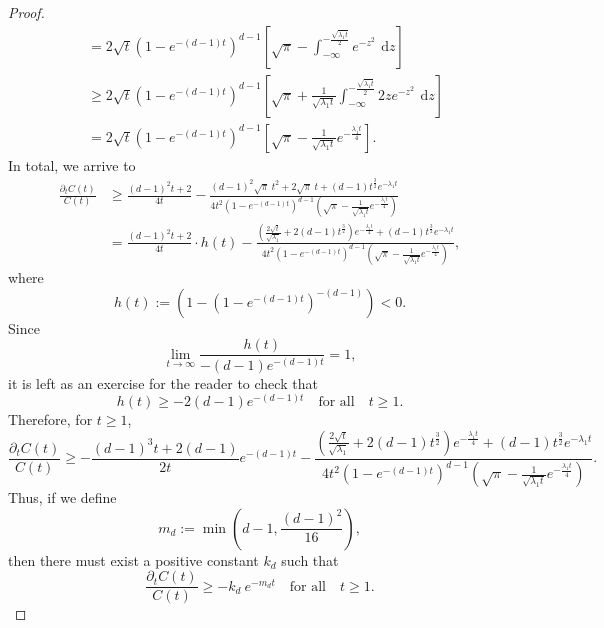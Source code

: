 \documentclass[10pt,a4paper]{amsart}
\def\d{\,\mathrm{d}}
\begin{document}
\begin{proof}
\[\begin{aligned}
		&= 2\sqrt{t} \left(1- e^{-(d-1)t}\right)^{d-1}\left[\sqrt{\pi} - \int_{-\infty}^{-\frac{\sqrt{\lambda_1 t}}{2}}  e^{-z^2}\ \d z \right]\\[10pt]
		&\geq 2\sqrt{t} \left(1- e^{-(d-1)t}\right)^{d-1}\left[\sqrt{\pi} +\frac{1}{\sqrt{\lambda_1 t}} \int_{-\infty}^{-\frac{\sqrt{\lambda_1 t}}{2}} 2z e^{-z^2}\ \d z \right]\\[10pt]
		&= 2\sqrt{t} \left(1- e^{-(d-1)t}\right)^{d-1}\left[\sqrt{\pi} - \frac{1}{\sqrt{\lambda_1 t}}e^{-{\frac{\lambda_1 t}{4}}} \right].
	\end{aligned}
	\]
	In total, we arrive to
	\[
	\begin{aligned}
		\frac{\partial_t C(t)}{C(t)}&\geq \frac{(d-1)^2t+2}{4t} - \frac{(d-1)^2\sqrt{\pi}\ t^2  +2\sqrt{\pi}\ t  + (d-1)t^\frac{3}{2}e^{-\lambda_1 t}}{4t^2\left(1-e^{-(d-1)t}\right)^{d-1} \left(\sqrt{\pi} - \frac{1}{\sqrt{\lambda_1 t}}e^{-\frac{\lambda_1 t}{4}}\right)}\\[10pt]
		&=\frac{(d-1)^2t+2}{4t}\cdot h(t) - \frac{\left(\frac{2\sqrt{t}}{\sqrt{\lambda_1}}+2(d-1)t^{\frac{3}{2}}\right)e^{-\frac{\lambda_1 t}{4}} + (d-1)t^\frac{3}{2}e^{-\lambda_1 t} }{4t^2\left(1-e^{-(d-1)t}\right)^{d-1} \left(\sqrt{\pi} - \frac{1}{\sqrt{\lambda_1 t}}e^{-\frac{\lambda_1 t}{4}}\right)},
	\end{aligned}
	\]
	where
	\begin{equation}\label{eq:def_h(t)}
		h(t):= \left(1-\left(1-e^{-(d-1)t}\right)^{-(d-1)}\right)<0.
	\end{equation}
	Since
	\[
	\lim\limits_{t\to\infty} \frac{h(t)}{-(d-1)e^{-(d-1)t}} = 1,
	\]
	it is left as an exercise for the reader to check that 
	\[
	h(t)\geq -2(d-1)e^{-(d-1)t}\quad\text{for all}\quad t\geq 1.
	\]
	Therefore, for $t\geq 1$,
	\[
	\frac{\partial_t C(t)}{C(t)}\geq -\frac{(d-1)^3t+2(d-1)}{2t} e^{-(d-1)t} - \frac{\left(\frac{2\sqrt{t}}{\sqrt{\lambda_1}}+2(d-1)t^{\frac{3}{2}}\right)e^{-\frac{\lambda_1 t}{4}} + (d-1)t^\frac{3}{2}e^{-\lambda_1 t} }{4t^2\left(1-e^{-(d-1)t}\right)^{d-1} \left(\sqrt{\pi} - \frac{1}{\sqrt{\lambda_1 t}}e^{-\frac{\lambda_1 t}{4}}\right)}.
	\]
	Thus, if we define 
	\begin{equation}\label{eq:def_m_d}
		m_d := \min \left(d-1, \frac{(d-1)^2}{16}\right),
	\end{equation}
	then there must exist a positive constant $k_d$ such that
	\[
	\frac{\partial_t C(t)}{C(t)}\geq -k_d\ e^{-m_d t} \quad\text{for all}\quad t\geq 1.
	\]
	

\end{proof}
\end{document}
